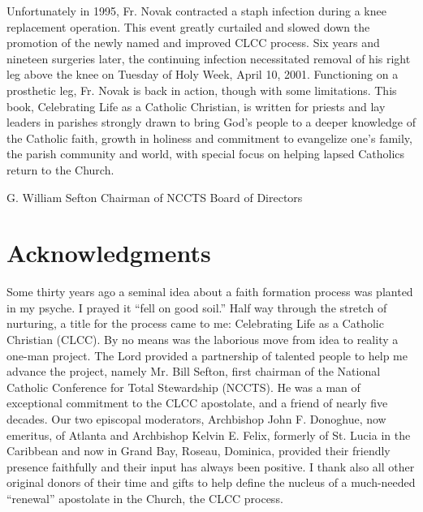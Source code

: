 \documentclass[oneside]{book}
\begin{document}
Unfortunately in 1995, Fr. Novak contracted a staph infection during a knee
replacement operation. This event greatly curtailed and slowed down the
promotion of the newly named and improved CLCC process. Six years and nineteen
surgeries later, the continuing infection necessitated removal of his right leg
above the knee on Tuesday of Holy Week, April 10, 2001.
Functioning on a prosthetic leg, Fr. Novak is back in action, though with some
limitations. This book, Celebrating Life as a Catholic Christian, is written for
priests and lay leaders in parishes strongly drawn to bring God's people to a
deeper knowledge of the Catholic faith, growth in holiness and commitment to
evangelize one's family, the parish community and world, with special focus on
helping lapsed Catholics return to the Church.

G. William Sefton
Chairman of NCCTS Board of Directors


\chapter{Acknowledgments}

Some thirty years ago a seminal idea about a faith formation process was planted
in my psyche. I prayed it ``fell on good soil.'' Half way through the stretch of
nurturing, a title for the process came to me: Celebrating Life as a Catholic
Christian (CLCC). By no means was the laborious move from idea to reality a
one-man project. The Lord provided a partnership of talented people to help me
advance the project, namely Mr. Bill Sefton, first chairman of the National
Catholic Conference for Total Stewardship (NCCTS). He was a man of exceptional
commitment to the CLCC apostolate, and a friend of nearly five decades. Our two
episcopal moderators, Archbishop John F. Donoghue, now emeritus, of Atlanta and
Archbishop Kelvin E. Felix, formerly of St. Lucia in the Caribbean and now in
Grand Bay, Roseau, Dominica, provided their friendly presence faithfully  and
their input has always been positive. I thank also all other original donors of
their time and gifts to help define the nucleus of a much-needed ``renewal''
apostolate in the Church, the CLCC process.
\end{document}
